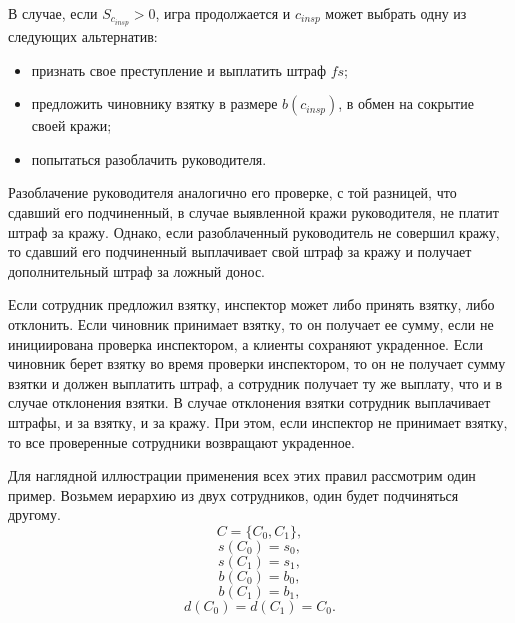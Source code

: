 В случае, если $S_{c_{insp}} > 0$, игра продолжается и $c_{insp}$ может выбрать одну из следующих альтернатив:
\begin{itemize}
	\item признать свое преступление и выплатить штраф $fs$;
	\item предложить чиновнику взятку в размере $b(c_{insp})$, в обмен на сокрытие своей кражи;
	\item попытаться разоблачить руководителя. 
\end{itemize}
Разоблачение руководителя аналогично его проверке, с той разницей, что сдавший его подчиненный, в случае выявленной кражи руководителя, не платит штраф за кражу. Однако, если разоблаченный руководитель не совершил кражу, то сдавший его подчиненный выплачивает свой штраф за кражу и получает дополнительный штраф за ложный донос.
\par 
Если сотрудник предложил взятку, инспектор может либо принять взятку, либо отклонить. Если чиновник принимает взятку, то он получает ее сумму, если не инициирована проверка инспектором, а клиенты сохраняют украденное. Если чиновник берет взятку во время проверки инспектором, то он не получает сумму взятки и должен выплатить штраф, а сотрудник получает ту же выплату, что и в случае отклонения взятки. В случае отклонения взятки сотрудник выплачивает штрафы, и за взятку, и за кражу. При этом, если инспектор не принимает взятку, то все проверенные сотрудники возвращают украденное.
\par
Для наглядной иллюстрации применения всех этих правил рассмотрим один пример.
Возьмем иерархию из двух сотрудников, один будет подчиняться другому.
	$$C = \{C_0, C_1\},$$
	$$s(C_0) = s_0,$$
	$$s(C_1) = s_1,$$
	\begin{equation}\label{eq2.9} b(C_0) = b_0,\end{equation}
	$$b(C_1) = b_1,$$
	$$d(C_0) = d(C_1) = C_0.$$

